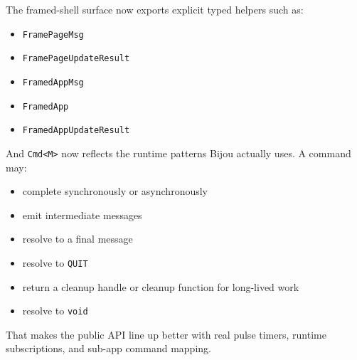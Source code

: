 The framed-shell surface now exports explicit typed helpers such as:

\begin{itemize}
\tightlist
\item
  \texttt{F\allowbreak{}r\allowbreak{}a\allowbreak{}m\allowbreak{}e\allowbreak{}P\allowbreak{}a\allowbreak{}g\allowbreak{}e\allowbreak{}M\allowbreak{}s\allowbreak{}g}
\item
  \texttt{F\allowbreak{}r\allowbreak{}a\allowbreak{}m\allowbreak{}e\allowbreak{}P\allowbreak{}a\allowbreak{}g\allowbreak{}e\allowbreak{}U\allowbreak{}p\allowbreak{}d\allowbreak{}a\allowbreak{}t\allowbreak{}e\allowbreak{}R\allowbreak{}e\allowbreak{}s\allowbreak{}u\allowbreak{}l\allowbreak{}t}
\item
  \texttt{F\allowbreak{}r\allowbreak{}a\allowbreak{}m\allowbreak{}e\allowbreak{}d\allowbreak{}A\allowbreak{}p\allowbreak{}p\allowbreak{}M\allowbreak{}s\allowbreak{}g}
\item
  \texttt{F\allowbreak{}r\allowbreak{}a\allowbreak{}m\allowbreak{}e\allowbreak{}d\allowbreak{}A\allowbreak{}p\allowbreak{}p}
\item
  \texttt{F\allowbreak{}r\allowbreak{}a\allowbreak{}m\allowbreak{}e\allowbreak{}d\allowbreak{}A\allowbreak{}p\allowbreak{}p\allowbreak{}U\allowbreak{}p\allowbreak{}d\allowbreak{}a\allowbreak{}t\allowbreak{}e\allowbreak{}R\allowbreak{}e\allowbreak{}s\allowbreak{}u\allowbreak{}l\allowbreak{}t}
\end{itemize}

And \texttt{C\allowbreak{}m\allowbreak{}d\allowbreak{}<\allowbreak{}M\allowbreak{}>} now reflects the runtime patterns Bijou actually uses. A command may:

\begin{itemize}
\tightlist
\item
  complete synchronously or asynchronously
\item
  emit intermediate messages
\item
  resolve to a final message
\item
  resolve to \texttt{Q\allowbreak{}U\allowbreak{}I\allowbreak{}T}
\item
  return a cleanup handle or cleanup function for long-lived work
\item
  resolve to \texttt{v\allowbreak{}o\allowbreak{}i\allowbreak{}d}
\end{itemize}

That makes the public API line up better with real pulse timers, runtime subscriptions, and sub-app command mapping.

